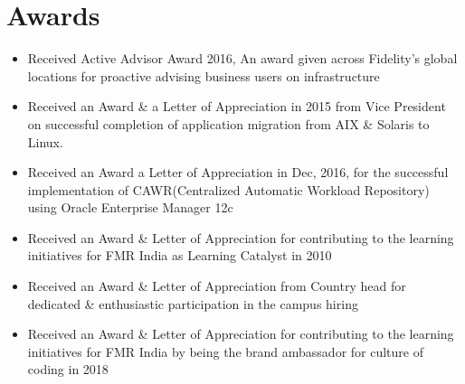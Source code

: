 \documentclass[letterpaper,11pt]{article}
\begin{document}
\section{Awards}
\begin{itemize}\setlength{\itemsep}{0pt}
\item Received Active Advisor Award 2016, An award given across Fidelity’s global locations for proactive advising business users on infrastructure 
\item Received an Award \& a Letter of Appreciation in 2015 from Vice President on successful completion of application migration from AIX \& Solaris to Linux.
\item \begin{justify}Received an Award a Letter of Appreciation in Dec, 2016, for the successful implementation of CAWR(Centralized Automatic Workload Repository) using Oracle Enterprise Manager 12c\end{justify}
\item Received an Award \& Letter of Appreciation for contributing to the learning initiatives for FMR India as Learning Catalyst in 2010
\item Received an Award \& Letter of Appreciation from Country head for dedicated \&
enthusiastic participation in the campus hiring
\item Received an Award \& Letter of Appreciation for contributing to the learning initiatives for FMR India by being the brand ambassador for culture of coding in 2018
\end{itemize}
\end{document}
